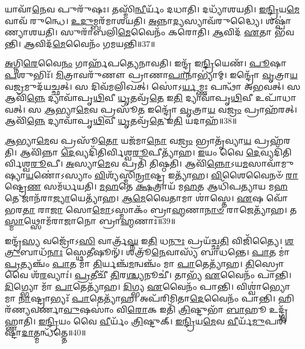 𑌯𑌾𑌵𑌾᳴\-\ul{𑌨𑍇}\-𑌵 𑌪𑍁𑌰𑍁᳴𑌷𑌃।
𑌤𑌸𑍍𑌮𑌿᳴\-\ul{𑌨𑍍𑌵𑍀}\-𑌰𑍍𑌯𑌂᳴ 𑌦𑌧𑌾𑌤𑌿।
𑌦𑌧𑍍𑌯𑌾᳴𑌶𑌯𑌤𑌿।
\-\ul{𑌇}\-\-\ul{𑌨𑍍𑌦𑍍𑌰𑌿}\-𑌯\-\ul{𑌮𑍇}\-𑌵𑌾𑌵᳴ 𑌰𑍁𑌨𑍍𑌧𑍇।
\-\ul{𑌉}\-\-\ul{𑌦𑍁}\-𑌮𑍍𑌬𑌰᳴𑌮𑌾𑌶𑌯𑌤𑌿।
\-\ul{𑌅}\-𑌨𑍍𑌨𑌾\-\ul{𑌦𑍍𑌯}\-𑌸𑍍𑌯𑌾𑌵᳴𑌰𑍁𑌦𑍍𑌧𑍍𑌯𑍈।
𑌶𑌷𑍍𑌪𑌾॑𑌣𑍍𑌯𑌾𑌶𑌯𑌤𑌿।
𑌸𑍁𑌰𑌾᳴𑌬𑌲𑌿\-\ul{𑌮𑍇}\-𑌵𑍈𑌨𑌂᳴ 𑌕𑌰𑍋𑌤𑌿।
\-\ul{𑌆}\-𑌵𑌿𑌦᳴ \ul{𑌏}\-𑌤𑌾 𑌭᳴𑌵𑌨𑍍𑌤𑌿।
\-\ul{𑌆}\-𑌵𑌿𑌦᳴\-\ul{𑌮𑍇}\-𑌵𑍈𑌨𑌂᳴ 𑌗𑌮𑌯𑌨𑍍𑌤𑌿॥37॥

\-\ul{𑌅}\-𑌗𑍍𑌨𑌿\-\ul{𑌰𑍇}\-𑌵𑍈\-\ul{𑌨𑌂} 𑌗𑌾𑌰𑍍\mbox{}𑌹᳴𑌪𑌤𑍍𑌯𑍇𑌨𑌾𑌵𑌤𑌿।
𑌇𑌨𑍍𑌦𑍍𑌰᳴ 𑌇\-\ul{𑌨𑍍𑌦𑍍𑌰𑌿}\-𑌯𑍇𑌣᳴।
\-\ul{𑌪𑍂}\-𑌷𑌾 \ul{𑌪}\-𑌶𑍁𑌭𑌿𑌃᳴।
\-\ul{𑌮𑌿}\-𑌤𑍍𑌰𑌾𑌵𑌰𑍁᳴𑌣𑍗 𑌪𑍍𑌰𑌾𑌣𑌾\-\ul{𑌪𑌾}\-𑌨𑌾𑌭𑍍𑌯𑌾॑𑌮𑍍।
𑌇𑌨𑍍𑌦𑍍𑌰𑍋᳴ \ul{𑌵𑍃}\-𑌤𑍍𑌰𑌾\-\ul{𑌯} 𑌵\-\ul{𑌜𑍍𑌰}\-𑌮𑍁𑌦᳴𑌯𑌚𑍍𑌛𑌤𑍍।
𑌸 𑌦𑌿𑌵᳴𑌮𑌲𑌿𑌖𑌤𑍍।
𑌸𑍋॑𑌽\-\ul{𑌰𑍍𑌯}\-𑌮𑍍𑌣𑌃 𑌪𑌨𑍍𑌥𑌾᳴ 𑌅𑌭𑌵𑌤𑍍।
𑌸 𑌆𑌵𑌿᳴\-\ul{𑌨𑍍𑌨𑍇} 𑌦𑍍𑌯𑌾𑌵𑌾᳴𑌪𑍃\-\ul{𑌥𑌿}\-𑌵𑍀 \ul{𑌧𑍃}\-𑌤𑌵𑍍𑌰᳴\-\ul{𑌤𑍇} 𑌇\-\ul{𑌤𑌿} 𑌦𑍍𑌯𑌾𑌵𑌾᳴𑌪𑍃\-\ul{𑌥𑌿}\-𑌵𑍀 𑌉𑌪𑌾᳴𑌧𑌾𑌵𑌤𑍍।
𑌸 \ul{𑌆}\-𑌭𑍍𑌯𑌾\-\ul{𑌮𑍇}\-𑌵 𑌪𑍍𑌰𑌸𑍂᳴\-\ul{𑌤} 𑌇𑌨𑍍𑌦𑍍𑌰𑍋᳴ \ul{𑌵𑍃}\-𑌤𑍍𑌰𑌾\-\ul{𑌯} 𑌵\-\ul{𑌜𑍍𑌰𑌂} 𑌪𑍍𑌰𑌾𑌹᳴𑌰𑌤𑍍।
𑌆𑌵𑌿᳴\-\ul{𑌨𑍍𑌨𑍇} 𑌦𑍍𑌯𑌾𑌵𑌾᳴𑌪𑍃\-\ul{𑌥𑌿}\-𑌵𑍀 \ul{𑌧𑍃}\-𑌤𑌵𑍍𑌰᳴\-\ul{𑌤𑍇} 𑌇\-\ul{𑌤𑌿} 𑌯𑌦𑌾𑌹᳴॥38॥

\-\ul{𑌆}\-𑌭𑍍𑌯𑌾\-\ul{𑌮𑍇}\-𑌵 𑌪𑍍𑌰𑌸𑍂᳴\-\ul{𑌤𑍋} 𑌯𑌜᳴𑌮𑌾\-\ul{𑌨𑍋} 𑌵\-\ul{𑌜𑍍𑌰𑌂} 𑌭𑍍𑌰𑌾𑌤𑍃᳴𑌵𑍍𑌯𑌾\-\ul{𑌯} 𑌪𑍍𑌰𑌹᳴𑌰𑌤𑌿।
𑌆𑌵𑌿᳴𑌨𑍍𑌨𑌾 \ul{𑌦𑍇}\-𑌵𑍍𑌯𑌦𑌿᳴𑌤𑌿𑌰𑍍𑌵𑌿𑌶𑍍𑌵\-\ul{𑌰𑍂}\-𑌪𑍀𑌤𑍍𑌯𑌾᳴𑌹।
\-\ul{𑌇}\-𑌯𑌂 𑌵𑍈 \ul{𑌦𑍇}\-𑌵𑍍𑌯𑌦𑌿᳴𑌤𑌿𑌰𑍍𑌵𑌿𑌶𑍍𑌵\-\-\ul{𑌰𑍂}\-𑌪𑍀।
\-\ul{𑌅}\-𑌸𑍍𑌯𑌾\-\ul{𑌮𑍇}\-𑌵 𑌪𑍍𑌰𑌤𑌿᳴ 𑌤𑌿𑌷𑍍𑌠𑌤𑌿।
𑌆𑌵𑌿᳴\-\ul{𑌨𑍍𑌨𑍋}\-\-𑌽𑌯\-\ul{𑌮}\-𑌸𑌾𑌵𑌾᳴𑌮𑍁𑌷𑍍𑌯𑌾\-\-\ul{𑌯}\-𑌣𑍋॑\-𑌽𑌸𑍍𑌯𑌾𑌂 \ul{𑌵𑌿}\-𑌶𑍍𑌯᳴𑌸𑍍𑌮𑌿\-\ul{𑌨𑍍𑌰𑌾}\-𑌷𑍍𑌟𑍍𑌰 𑌇𑌤𑍍𑌯𑌾᳴𑌹।
\-\ul{𑌵𑌿}\-𑌶𑍈𑌵𑍈𑌨𑍞᳴ \ul{𑌰𑌾}\-𑌷𑍍𑌟𑍍𑌰𑍇\-\ul{𑌣} 𑌸𑌮᳴𑌰𑍍𑌧𑌯𑌤𑌿।
\-\ul{𑌮}\-\-\ul{𑌹}\-𑌤𑍇 \ul{𑌕𑍍𑌷}\-𑌤𑍍𑌰𑌾𑌯᳴ 𑌮\-\ul{𑌹}\-𑌤 𑌆𑌧𑌿᳴𑌪𑌤𑍍𑌯𑌾𑌯 𑌮\-\ul{𑌹}\-𑌤𑍇 𑌜𑌾𑌨᳴𑌰𑌾\-\ul{𑌜𑍍𑌯𑌾}\-𑌯𑍇𑌤𑍍𑌯𑌾᳴𑌹।
\-\ul{𑌆}\-\-\-\ul{𑌮𑍇}\-𑌵𑍈𑌤𑌾𑌮𑌾 𑌶𑌾॑𑌸𑍍𑌤𑍇।
\-\ul{𑌏}\-𑌷 𑌵𑍋᳴ 𑌭𑌰\-\ul{𑌤𑌾} 𑌰𑌾\-\ul{𑌜𑌾} 𑌸𑍋\-\ul{𑌮𑍋}\-\-𑌽𑌸𑍍𑌮𑌾𑌕𑌂᳴ 𑌬𑍍𑌰𑌾\-\ul{𑌹𑍍𑌮}\-𑌣𑌾\-\ul{𑌨𑌾}\-\-\ul{𑍞} 𑌰𑌾𑌜𑍇𑌤𑍍𑌯𑌾᳴𑌹।
𑌤\-\ul{𑌸𑍍𑌮𑌾}\-𑌥𑍍𑌸𑍋𑌮᳴𑌰𑌾𑌜𑌾𑌨𑍋 𑌬𑍍𑌰𑌾\-\ul{𑌹𑍍𑌮}\-𑌣𑌾𑌃॥39॥

𑌇𑌨𑍍𑌦𑍍𑌰᳴\-\ul{𑌸𑍍𑌯} 𑌵𑌜𑍍𑌰𑍋᳴𑌽\-\ul{𑌸𑌿} 𑌵𑌾𑌰𑍍𑌤𑍍𑌰᳴\-\ul{𑌘𑍍𑌨} 𑌇\-\ul{𑌤𑌿} 𑌧\-\ul{𑌨𑍁𑌃} 𑌪𑍍𑌰𑌯᳴𑌚𑍍𑌛\-\ul{𑌤𑌿} 𑌵𑌿𑌜𑌿᳴𑌤𑍍𑌯𑍈।
\-\ul{𑌶}\-\-\ul{𑌤𑍍𑌰𑍁}\-𑌬𑌾𑌧᳴\-\ul{𑌨𑌾𑌃} 𑌸𑍍𑌥𑍇𑌤𑍀𑌷𑍂𑌨𑍍᳴।
𑌶𑌤𑍍𑌰𑍂᳴\-\ul{𑌨𑍇}\-𑌵𑌾𑌸𑍍𑌯᳴ 𑌬𑌾𑌧𑌨𑍍𑌤𑍇।
\-\ul{𑌪𑌾}\-𑌤 𑌮𑌾॑ \ul{𑌪𑍍𑌰}\-𑌤𑍍𑌯𑌞𑍍𑌚𑌂᳴ \ul{𑌪𑌾}\-𑌤 𑌮𑌾᳴ \ul{𑌤𑌿}\-𑌰𑍍𑌯𑌞𑍍𑌚᳴\-\ul{𑌮}\-𑌨𑍍𑌵𑌞𑍍𑌚𑌂᳴ 𑌮𑌾 \ul{𑌪𑌾}\-𑌤𑍇𑌤𑍍𑌯𑌾᳴𑌹।
\-\ul{𑌤𑌿}\-𑌸𑍍𑌰𑍋 𑌵𑍈 𑌶᳴\-\ul{𑌰}\-𑌵𑍍𑌯𑌾𑌃॑।
\-\ul{𑌪𑍍𑌰}\-𑌤𑍀𑌚𑍀᳴ \ul{𑌤𑌿}\-𑌰\-\ul{𑌶𑍍𑌚𑍍𑌯}\-𑌨𑍂𑌚𑍀॑।
𑌤𑌾𑌭𑍍𑌯᳴ \ul{𑌏}\-𑌵𑍈𑌨𑌂᳴ 𑌪𑌾𑌨𑍍𑌤𑌿।
\-\ul{𑌦𑌿}\-𑌗𑍍𑌭𑍍𑌯𑍋 𑌮𑌾᳴ \ul{𑌪𑌾}\-𑌤𑍇𑌤𑍍𑌯𑌾᳴𑌹।
\-\ul{𑌦𑌿}\-𑌗𑍍𑌭𑍍𑌯 \ul{𑌏}\-𑌵𑍈𑌨𑌂᳴ 𑌪𑌾𑌨𑍍𑌤𑌿।
𑌵𑌿𑌶𑍍𑌵𑌾॑𑌭𑍍𑌯𑍋 𑌮𑌾 \ul{𑌨𑌾}\-𑌷𑍍𑌟𑍍𑌰𑌾𑌭𑍍𑌯𑌃᳴ \ul{𑌪𑌾}\-𑌤𑍇𑌤𑍍𑌯𑌾᳴𑌹।
𑌅𑌪᳴𑌰𑌿𑌮𑌿𑌤𑌾\-\ul{𑌦𑍇}\-𑌵𑍈𑌨𑌂᳴ 𑌪𑌾𑌨𑍍𑌤𑌿।
𑌹𑌿𑌰᳴𑌣𑍍𑌯𑌵𑌰𑍍𑌣𑌾\-\ul{𑌵𑍁}\-𑌷𑌸𑌾𑌂॑ 𑌵𑌿\-\ul{𑌰𑍋}\-𑌕 𑌇𑌤𑌿᳴ \ul{𑌤𑍍𑌰𑌿}\-𑌷𑍍𑌟𑍁𑌭𑌾᳴ \ul{𑌬𑌾}\-𑌹𑍂 𑌉𑌦𑍍𑌗𑍃᳴𑌹𑍍𑌣𑌾𑌤𑌿।
\-\ul{𑌇}\-\-\ul{𑌨𑍍𑌦𑍍𑌰𑌿}\-𑌯𑌂 𑌵𑍈 \ul{𑌵𑍀}\-𑌰𑍍𑌯𑌂᳴ \ul{𑌤𑍍𑌰𑌿}\-𑌷𑍍𑌟𑍁𑌕𑍍।
\-\ul{𑌇}\-\-\ul{𑌨𑍍𑌦𑍍𑌰𑌿}\-𑌯\-\ul{𑌮𑍇}\-𑌵 \ul{𑌵𑍀}\-𑌰𑍍𑌯᳴\-\ul{𑌮𑍁}\-𑌪𑌰𑌿᳴𑌷𑍍𑌟𑌾\-\ul{𑌦𑌾}\-𑌤𑍍𑌮𑌨𑍍𑌧᳴𑌤𑍍𑌤𑍇॥40॥\anuvakamend[𑌵𑍍𑌯𑌾𑌵𑍃᳴𑌤𑍍𑌤𑍍𑌯𑍈 \ul{𑌦𑌾}\-𑌤𑍍𑌰\-\ul{𑌮}\-𑌸𑍀𑌤𑍍𑌯𑌾᳴\-\ul{𑌹𑌾}\-𑌮𑍃\-\ul{𑌤}\-\-\ul{𑍞} 𑌹𑌿𑌰᳴𑌣𑍍𑌯𑌮𑍇𑌕\-\ul{𑌶}\-𑌤𑍋 𑌗᳴𑌮\-\ul{𑌯}\-𑌨𑍍𑌤𑍍𑌯𑌾𑌹᳴ 𑌬𑍍𑌰𑌾\-\ul{𑌹𑍍𑌮}\-𑌣𑌾 \ul{𑌨𑌾}\-𑌷𑍍𑌟𑍍𑌰𑌾𑌭𑍍𑌯𑌃᳴ \ul{𑌪𑌾}\-𑌤𑍇𑌤𑍍𑌯𑌾᳴𑌹 \ul{𑌚}\-𑌤𑍍𑌵𑌾𑌰𑌿᳴ 𑌚]

